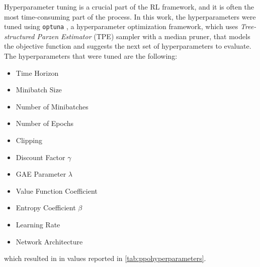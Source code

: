 Hyperparameter tuning is a crucial part of the \ac{RL} framework, and it is often the most time-consuming part of the process. In this work, the hyperparameters were tuned using \texttt{optuna} \citep{akiba_optuna_2019}, a hyperparameter optimization framework, which uses \textit{Tree-structured Parzen Estimator} (\ac{TPE}) sampler with a median pruner, that models the objective function and suggests the next set of hyperparameters to evaluate. The hyperparameters that were tuned are the following:

\begin{itemize}
    \item Time Horizon
    \item Minibatch Size
    \item Number of Minibatches
    \item Number of Epochs
    \item Clipping
    \item Discount Factor $\gamma$
    \item GAE Parameter $\lambda$
    \item Value Function Coefficient
    \item Entropy Coefficient $\beta$
    \item Learning Rate
    \item Network Architecture
\end{itemize}

which resulted in in values reported in \cref{tab:ppohyperparameters}.


